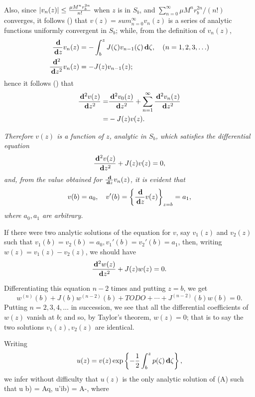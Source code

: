 Also, since $\left| v_{n}(z) \right| \leq \frac{\mu M^{n} r_{b}^{2n}}{n!}$ when $z$ is in $S_{b}$, and
$\sum_{n=0}^{\infty} \mu M^{n} r_{b}^{2n}/(n!)$ converges,
it follows () that
$v(z) = sum_{n=0}^{\infty} v_{n}(z)$ is a series of analytic functions
uniformly convergent in $S_{b}$; while, from the definition of $v_{n}(z)$,
\begin{align*}
  \frac{\, \mathbf{d}}{\, \mathbf{d} z} v_{n}(z)
  &= -\int_{b}^{z} J(\zeta) v_{n-1}(\zeta) \, \mathbf{d} \zeta,
  \quad (n = 1,2,3,\ldots)
  \\
  \frac{\, \mathbf{d}^{2}}{\, \mathbf{d} z^{2}} v_{n}(z)
  &= -J(z) v_{n-1}(z);
\end{align*}
hence it follows () that
\begin{align*}
  \frac{\, \mathbf{d}^{2} v(z)}{\, \mathbf{d} z^{2}}
  =&
  \frac{\, \mathbf{d}^{2} v_{0}(z)}{\, \mathbf{d} z^{2}}
  +
  \sum_{n=1}^{\infty} \frac{\, \mathbf{d}^{2} v_{n}(z)}{\, \mathbf{d} z^{2}}
  \\
  =&
  - J(z) v(z).
\end{align*}

\emph{Therefore $v(z)$ is a function of $z$, analytic in $S_{b}$, which satisfies
the differential equation
$$
\frac{\, \mathbf{d}^{2} v(z)}{\, \mathbf{d} z^{2}} + J(z) v(z) = 0,
$$
%
%
and, from the value obtained for
$\frac{\, \mathbf{d}}{\, \mathbf{d} z} v_{n}(z)$, it is evident that
$$
v(b) = a_{0},
\quad
v'(b) = \left\{ \frac{\, \mathbf{d}}{\, \mathbf{d} z}v(z) \right\}_{z=b} = a_{1},
$$
where $a_{0}, a_{1}$ are arbitrary.}


If there were two analytic solutions of the equation for $v$,
say $v_{1}(z)$ and $v_{2}(z)$ such that
$v_{1}(b) = v_{2}(b) = a_{0}, v_{1}'(b) = v_{2}'(b) = a_{1}$, then,
writing $w(z) = v_{1}(z) - v_{2}(z)$, we should have
$$
\frac{\, \mathbf{d}^{2} w(z)}{\, \mathbf{d} z^{2}} + J(z) w(z) = 0.
$$

Differentiating this equation $n-2$ times and putting $z = b$, we get
$$
w^{(n)}(b) + J(b) w^{(n-2)}(b) + TODO
+ \cdots + J^{(n-2)}(b) w(b) = 0.
$$
Putting $n = 2, 3, 4, \ldots$ in succession, we see that all the
differential coefficients of $w(z)$ vanish at $b$; and so, by Taylor's
theorem, $w(z) = 0$; that is to say the two solutions
$v_{1}(z), v_{2}(z)$ are identical.

Writing
$$
u(z) = v(z) \exp \left\{ 
  - \frac{1}{2} \int_{b}^{z} p(\zeta) \, \mathbf{d} \zeta
 \right\},
$$
we infer without difficulty that $u(z)$ is the only analytic solution
of (A) %
such that u b) = Aq, u'ib) = A-, where

